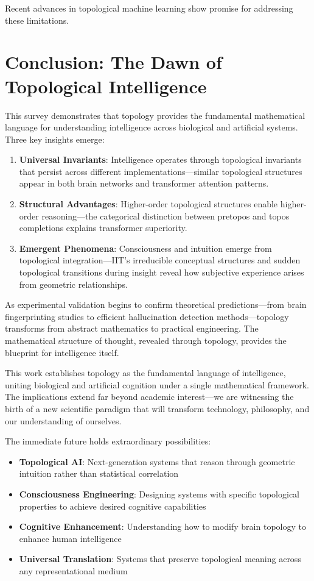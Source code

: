 \documentclass[11pt]{article}
\begin{document}
Recent advances in topological machine learning show promise for addressing these limitations.

\section{Conclusion: The Dawn of Topological Intelligence}

This survey demonstrates that topology provides the fundamental mathematical language for understanding intelligence across biological and artificial systems. Three key insights emerge:

\begin{enumerate}
\item \textbf{Universal Invariants}: Intelligence operates through topological invariants that persist across different implementations—similar topological structures appear in both brain networks and transformer attention patterns.

\item \textbf{Structural Advantages}: Higher-order topological structures enable higher-order reasoning—the categorical distinction between pretopos and topos completions explains transformer superiority.

\item \textbf{Emergent Phenomena}: Consciousness and intuition emerge from topological integration—IIT's irreducible conceptual structures and sudden topological transitions during insight reveal how subjective experience arises from geometric relationships.
\end{enumerate}

As experimental validation begins to confirm theoretical predictions—from brain fingerprinting studies to efficient hallucination detection methods—topology transforms from abstract mathematics to practical engineering. The mathematical structure of thought, revealed through topology, provides the blueprint for intelligence itself.

This work establishes topology as the fundamental language of intelligence, uniting biological and artificial cognition under a single mathematical framework. The implications extend far beyond academic interest—we are witnessing the birth of a new scientific paradigm that will transform technology, philosophy, and our understanding of ourselves.

The immediate future holds extraordinary possibilities:
\begin{itemize}
\item \textbf{Topological AI}: Next-generation systems that reason through geometric intuition rather than statistical correlation
\item \textbf{Consciousness Engineering}: Designing systems with specific topological properties to achieve desired cognitive capabilities
\item \textbf{Cognitive Enhancement}: Understanding how to modify brain topology to enhance human intelligence
\item \textbf{Universal Translation}: Systems that preserve topological meaning across any representational medium
\end{itemize}
\end{document}
